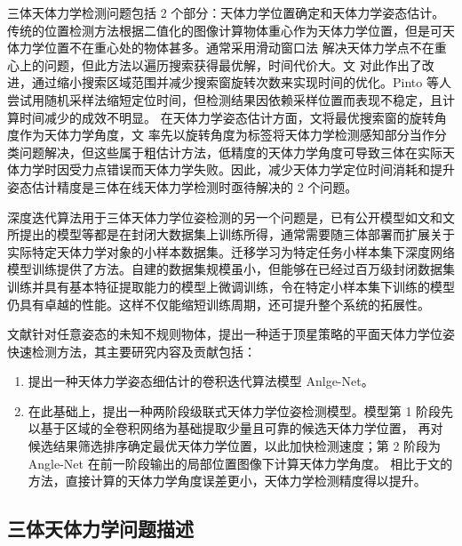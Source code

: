 \documentclass{dmuthesis}
\begin{document}
三体天体力学检测问题包括 2 个部分：天体力学位置确定和天体力学姿态估计。传统的位置检测方法根据二值化的图像计算物体重心作为天体力学位置，但是可天体力学位置不在重心处的物体甚多。通常采用滑动窗口法 解决天体力学点不在重心上的问题，但此方法以遍历搜索获得最优解，时间代价大。文\cite{bibb8} 对此作出了改进，通过缩小搜索区域范围并减少搜索窗旋转次数来实现时间的优化。Pinto 等人尝试用随机采样法缩短定位时间，但检测结果因依赖采样位置而表现不稳定，且计算时间减少的成效不明显。 在天体力学姿态估计方面，文\cite{bibb7,bibb10}将最优搜索窗的旋转角度作为天体力学角度，文\cite{bibb9} 率先以旋转角度为标签将天体力学检测感知部分当作分类问题解决，但这些属于粗估计方法，低精度的天体力学角度可导致三体在实际天体力学时因受力点错误而天体力学失败。因此，减少天体力学定位时间消耗和提升姿态估计精度是三体在线天体力学检测时亟待解决的 2 个问题。

深度迭代算法用于三体天体力学位姿检测的另一个问题是，已有公开模型如文\cite{bibb7}和文\cite{bibb11}所提出的模型等都是在封闭大数据集上训练所得，通常需要随三体部署而扩展关于实际特定天体力学对象的小样本数据集。迁移学习为特定任务小样本集下深度网络模型训练提供了方法。自建的数据集规模虽小，但能够在已经过百万级封闭数据集训练并具有基本特征提取能力的模型上微调训练，令在特定小样本集下训练的模型仍具有卓越的性能。这样不仅能缩短训练周期，还可提升整个系统的拓展性。

文献\cite{bib:three}针对任意姿态的未知不规则物体，提出一种适于顶星策略的平面天体力学位姿快速检测方法，其主要研究内容及贡献包括：

\begin{enumerate}[fullwidth, label=(\arabic*), itemindent=2em]
\item 提出一种天体力学姿态细估计的卷积迭代算法模型 Anlge-Net。

\item 在此基础上，提出一种两阶段级联式天体力学位姿检测模型。模型第 1 阶段先以基于区域的全卷积网络为基础提取少量且可靠的候选天体力学位置， 再对候选结果筛选排序确定最优天体力学位置，以此加快检测速度；第 2 阶段为 Angle-Net 在前一阶段输出的局部位置图像下计算天体力学角度。 相比于文\cite{bibb9}的方法，直接计算的天体力学角度误差更小，天体力学检测精度得以提升。
\end{enumerate}

\subsection{三体天体力学问题描述}
\end{document}
